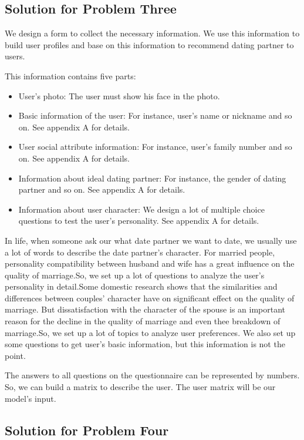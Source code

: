 \subsection{Solution for Problem Three}
We design a form to collect the necessary information. We use this information to build user profiles and base on this information to recommend dating partner to users.\par 
This information contains five parts:
\begin{itemize}
	\item User's photo: The user must show his face in the photo.
	\item Basic information of the user: For instance, user's name or nickname and so on. See appendix A for details.
	\item User social attribute information: For instance, user's family number and so on. See appendix A for details.
	\item Information about ideal dating partner: For instance, the gender of dating partner and so on. See appendix A for details. 
	\item Information about user character: We design a lot of multiple choice questions to test the user's personality. See appendix A for details.
\end{itemize}
\par 
In life, when someone ask our what date partner we want to date, we usually use a lot of words to describe the date partner's character. For married people, personality compatibility between husband and wife has a great influence on the quality of marriage\cite{1}.So, we set up a lot of questions to analyze the user's personality in detail.Some domestic research shows that the similarities and differences between couples' character have on significant effect on the quality of marriage. But dissatisfaction with the character of the spouse is an important reason for the decline in the quality of marriage and even thee breakdown of marriage\cite{2}.So, we set up a lot of topics to analyze user preferences. We also set up some questions to get user's basic information, but this information is not the point.\par 

The answers to all questions on the questionnaire can be represented by numbers. So, we can build a matrix to describe the user. The user matrix will be our model's input.



\subsection{Solution for Problem Four}


